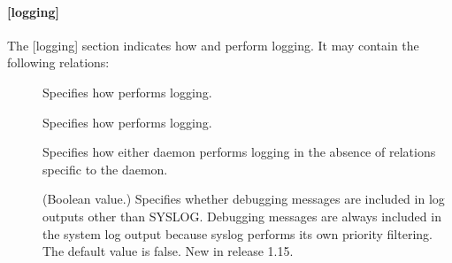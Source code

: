 \documentclass[letterpaper,10pt,english]{sphinxmanual}
\begin{document}
\paragraph{{[}logging{]}}
\label{\detokenize{admin/conf_files/kdc_conf:logging}}\label{\detokenize{admin/conf_files/kdc_conf:id4}}
\sphinxAtStartPar
The {[}logging{]} section indicates how {\hyperref[\detokenize{admin/admin_commands/krb5kdc:krb5kdc-8}]{}} and
{\hyperref[\detokenize{admin/admin_commands/kadmind:kadmind-8}]{}} perform logging.  It may contain the following
relations:
\begin{description}
\item[{}] \leavevmode
\sphinxAtStartPar
Specifies how {\hyperref[\detokenize{admin/admin_commands/kadmind:kadmind-8}]{}} performs logging.

\item[{}] \leavevmode
\sphinxAtStartPar
Specifies how {\hyperref[\detokenize{admin/admin_commands/krb5kdc:krb5kdc-8}]{}} performs logging.

\item[{}] \leavevmode
\sphinxAtStartPar
Specifies how either daemon performs logging in the absence of
relations specific to the daemon.

\item[{}] \leavevmode
\sphinxAtStartPar
(Boolean value.)  Specifies whether debugging messages are
included in log outputs other than SYSLOG.  Debugging messages are
always included in the system log output because syslog performs
its own priority filtering.  The default value is false.  New in
release 1.15.

\end{description}
\end{document}

